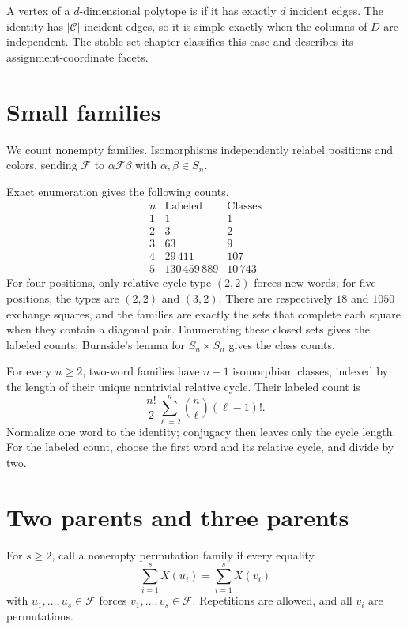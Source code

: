 A vertex of a $d$-dimensional polytope is  if it has
exactly $d$ incident edges. The identity has $|\mathcal C|$ incident
edges, so it is simple exactly when the columns of $D$ are independent.
The \href{stable-sets.htm}{stable-set chapter} classifies this case
and describes its assignment-coordinate facets.

\section[permutationEnumeration]{Small families}

We count nonempty families. Isomorphisms independently relabel positions
and colors, sending $\mathcal F$ to $\alpha\mathcal F\beta$ with
$\alpha,\beta\in S_n$.

Exact enumeration gives the following counts.
\[
\begin{array}{r|r|r}
 n&\text{Labeled}&\text{Classes}\\\hline
 1&1&1\\
 2&3&2\\
 3&63&9\\
 4&29\,411&107\\
 5&130\,459\,889&10\,743
\end{array}
\]
For four positions, only relative cycle type $(2,2)$ forces new words;
for five positions, the types are $(2,2)$ and $(3,2)$.
There are respectively $18$ and $1050$ exchange squares, and the families
are exactly the sets that complete each square when they contain a
diagonal pair. Enumerating these closed sets gives the labeled counts;
Burnside's lemma for $S_n\times S_n$ gives the class counts.

For every $n\geq2$, two-word families have $n-1$ isomorphism classes,
indexed by the length of their unique nontrivial relative cycle.
Their labeled count is
\[
 \frac{n!}{2}\sum_{\ell=2}^n\binom n\ell(\ell-1)!.
\]
Normalize one word to the identity; conjugacy then leaves only the
cycle length. For the labeled count, choose the first word and its
relative cycle, and divide by two.

\section[threeParentClosure]{Two parents and three parents}

For $s\geq2$, call a nonempty permutation family
 if every equality
\[
 \sum_{i=1}^sX(u_i)=\sum_{i=1}^sX(v_i)
\]
with $u_1,\dotsc,u_s\in\mathcal F$ forces
$v_1,\dotsc,v_s\in\mathcal F$. Repetitions are allowed,
and all $v_i$ are permutations.

